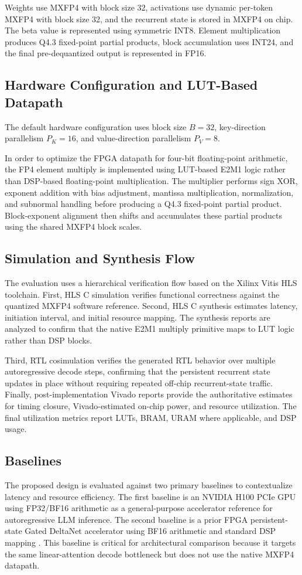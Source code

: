 \documentclass[conference]{IEEEtran}
\begin{document}
Weights use MXFP4 with block size 32, activations use dynamic per-token MXFP4 with block size 32, and the recurrent state is stored in MXFP4 on chip. The beta value is represented using symmetric INT8. Element multiplication produces Q4.3 fixed-point partial products, block accumulation uses INT24, and the final pre-dequantized output is represented in FP16.

\subsection{Hardware Configuration and LUT-Based Datapath}
The default hardware configuration uses block size $B=32$, key-direction parallelism $P_K=16$, and value-direction parallelism $P_V=8$.

In order to optimize the FPGA datapath for four-bit floating-point arithmetic, the FP4 element multiply is implemented using LUT-based E2M1 logic rather than DSP-based floating-point multiplication. The multiplier performs sign XOR, exponent addition with bias adjustment, mantissa multiplication, normalization, and subnormal handling before producing a Q4.3 fixed-point partial product. Block-exponent alignment then shifts and accumulates these partial products using the shared MXFP4 block scales.

\subsection{Simulation and Synthesis Flow}
The evaluation uses a hierarchical verification flow based on the Xilinx Vitis HLS toolchain. First, HLS C simulation verifies functional correctness against the quantized MXFP4 software reference. Second, HLS C synthesis estimates latency, initiation interval, and initial resource mapping. The synthesis reports are analyzed to confirm that the native E2M1 multiply primitive maps to LUT logic rather than DSP blocks.

Third, RTL cosimulation verifies the generated RTL behavior over multiple autoregressive decode steps, confirming that the persistent recurrent state updates in place without requiring repeated off-chip recurrent-state traffic. Finally, post-implementation Vivado reports provide the authoritative estimates for timing closure, Vivado-estimated on-chip power, and resource utilization. The final utilization metrics report LUTs, BRAM, URAM where applicable, and DSP usage.

\subsection{Baselines}
The proposed design is evaluated against two primary baselines to contextualize latency and resource efficiency. The first baseline is an NVIDIA H100 PCIe GPU using FP32/BF16 arithmetic as a general-purpose accelerator reference for autoregressive LLM inference. The second baseline is a prior FPGA persistent-state Gated DeltaNet accelerator using BF16 arithmetic and standard DSP mapping \cite{b10}. This baseline is critical for architectural comparison because it targets the same linear-attention decode bottleneck but does not use the native MXFP4 datapath.
\end{document}
